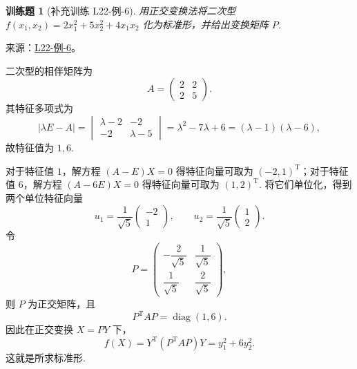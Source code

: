 \documentclass[UTF8,12pt,a4paper,fontset=fandol]{ctexart}
\newtheorem{exercise}{训练题}[section]
\begin{document}
\begin{exercise}[补充训练 L22-例-6]\label{prob:L22-例-6}
用正交变换法将二次型 $f(x_1,x_2) = 2x_1^2 + 5x_2^2 + 4x_1x_2$ 化为标准形，并给出变换矩阵 $P$.
\end{exercise}
\noindent 来源：\href{https://github.com/yhwu-is/Linear-Algebra-Left-Undone/blob/new/%E8%AE%B2%E4%B9%89/%E4%B8%93%E9%A2%98/22%20%E4%BA%8C%E6%AC%A1%E5%9E%8B.tex}{L22-例-6}。
\begin{solve}
二次型的相伴矩阵为
    \[
        A=\begin{pmatrix}
            2 & 2 \\
            2 & 5
        \end{pmatrix}.
    \]
    其特征多项式为
    \[
        |\lambda E-A|=\begin{vmatrix}
            \lambda-2 & -2        \\
            -2        & \lambda-5
        \end{vmatrix}
        =\lambda^2-7\lambda+6=(\lambda-1)(\lambda-6),
    \]
    故特征值为 $1,6$.

    对于特征值 $1$，解方程 $(A-E)X=0$ 得特征向量可取为 $(-2,1)^\mathrm{T}$；对于特征值 $6$，解方程 $(A-6E)X=0$ 得特征向量可取为 $(1,2)^\mathrm{T}$. 将它们单位化，得到两个单位特征向量
    \[
        u_1=\frac{1}{\sqrt{5}}\begin{pmatrix}
            -2 \\
            1
        \end{pmatrix},
        \qquad
        u_2=\frac{1}{\sqrt{5}}\begin{pmatrix}
            1 \\
            2
        \end{pmatrix}.
    \]
    令
    \[
        P=\begin{pmatrix}
            -\dfrac{2}{\sqrt{5}} & \dfrac{1}{\sqrt{5}} \\
            \dfrac{1}{\sqrt{5}}  & \dfrac{2}{\sqrt{5}}
        \end{pmatrix},
    \]
    则 $P$ 为正交矩阵，且
    \[
        P^\mathrm{T}AP=\operatorname{diag}(1,6).
    \]
    因此在正交变换 $X=PY$ 下，
    \[
        f(X)=Y^\mathrm{T}(P^\mathrm{T}AP)Y=y_1^2+6y_2^2.
    \]
    这就是所求标准形.
\end{solve}
\end{document}
